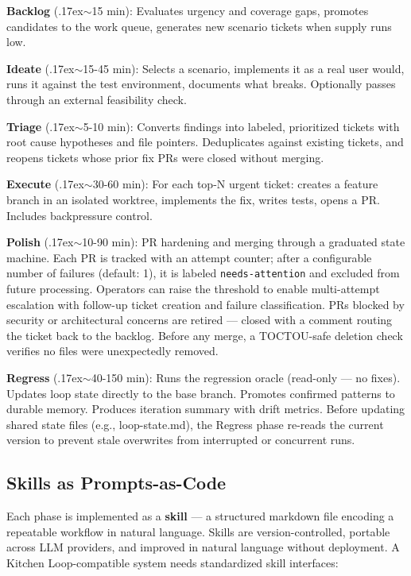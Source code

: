 \documentclass[11pt,a4paper]{article}
\newcommand{\roughly}{{\textraisebox{.17ex}{$\scriptstyle\sim$}}}
\newcommand{\textraisebox}[2]{\leavevmode\raise#1\hbox{#2}}
\begin{document}
\textbf{Backlog} (\roughly15 min): Evaluates urgency and coverage gaps, promotes candidates to the work queue, generates new scenario tickets when supply runs low.

\textbf{Ideate} (\roughly15-45 min): Selects a scenario, implements it as a real user would, runs it against the test environment, documents what breaks. Optionally passes through an external feasibility check.

\textbf{Triage} (\roughly5-10 min): Converts findings into labeled, prioritized tickets with root cause hypotheses and file pointers. Deduplicates against existing tickets, and reopens tickets whose prior fix PRs were closed without merging.

\textbf{Execute} (\roughly30-60 min): For each top-N urgent ticket: creates a feature branch in an isolated worktree, implements the fix, writes tests, opens a PR. Includes backpressure control.

\textbf{Polish} (\roughly10-90 min): PR hardening and merging through a graduated state machine. Each PR is tracked with an attempt counter; after a configurable number of failures (default: 1), it is labeled \texttt{needs-attention} and excluded from future processing. Operators can raise the threshold to enable multi-attempt escalation with follow-up ticket creation and failure classification. PRs blocked by security or architectural concerns are retired --- closed with a comment routing the ticket back to the backlog. Before any merge, a TOCTOU-safe deletion check verifies no files were unexpectedly removed.

\textbf{Regress} (\roughly40-150 min): Runs the regression oracle (read-only --- no fixes). Updates loop state directly to the base branch. Promotes confirmed patterns to durable memory. Produces iteration summary with drift metrics. Before updating shared state files (e.g., loop-state.md), the Regress phase re-reads the current version to prevent stale overwrites from interrupted or concurrent runs.

\subsection{Skills as Prompts-as-Code}\label{sec:skills-as-prompts-as-code}

Each phase is implemented as a \textbf{skill} --- a structured markdown file encoding a repeatable workflow in natural language. Skills are version-controlled, portable across LLM providers, and improved in natural language without deployment. A Kitchen Loop-compatible system needs standardized skill interfaces:
\end{document}

